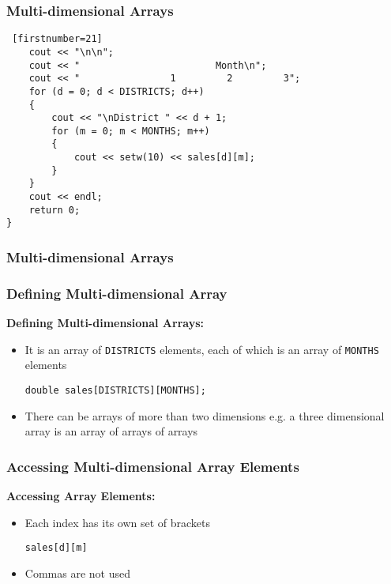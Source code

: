 \documentclass{beamer}
\begin{document}
\begin{frame}[fragile]\frametitle{Multi-dimensional Arrays}
    \lstset{style=mystyle}
\begin{lstlisting} [firstnumber=21]
    cout << "\n\n";
    cout << "                        Month\n";
    cout << "                1         2         3";
    for (d = 0; d < DISTRICTS; d++)
    {
        cout << "\nDistrict " << d + 1;
        for (m = 0; m < MONTHS; m++)
        {
            cout << setw(10) << sales[d][m];
        }
    }
    cout << endl;
    return 0;
}
\end{lstlisting}
\end{frame}

\begin{frame}[fragile]\frametitle{Multi-dimensional Arrays}
    \subsubsection{Defining Multi-dimensional Array} %
    \label{ssub:defining_multi_dimensional_arrays}
    \textbf{Defining Multi-dimensional Arrays:} \\
    \begin{itemize}
        \item It is an array of \texttt{DISTRICTS} elements, each of which is an array of \texttt{MONTHS} elements
        \begin{center}
            \texttt{double sales[DISTRICTS][MONTHS];}
        \end{center}
        \item There can be arrays of more than two dimensions e.g. a three dimensional array is an array of arrays of arrays
    \end{itemize}

    \subsubsection{Accessing Multi-dimensional Array Elements} %
    \label{ssub:accessing_multi_dimensional_array_elements}
    \textbf{Accessing Array Elements:} \\
    \begin{itemize}
        \item Each index has its own set of brackets
        \begin{center}
            \texttt{sales[d][m]}
        \end{center}
        \item Commas are not used
     \end{itemize}
\end{frame}
\end{document}
